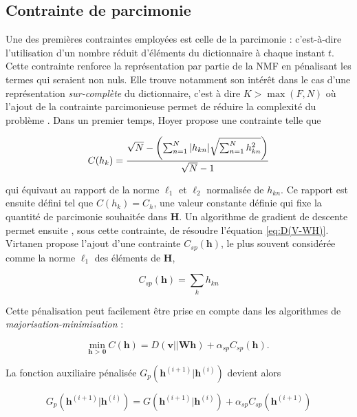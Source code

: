 \subsection{Contrainte de parcimonie}
Une des premières contraintes employées est celle de la parcimonie \cite{hoyer_non-negative_2004, le2015sparse} : c'est-à-dire l'utilisation d'un nombre réduit d'éléments du dictionnaire à chaque instant $t$. Cette contrainte renforce la représentation par partie de la NMF en pénalisant les termes qui seraient non nuls. Elle trouve notamment son intérêt dans le cas d'une représentation \textit{sur-complète} du dictionnaire, c'est à dire $K > \max(F,N)$ où l'ajout de la contrainte parcimonieuse permet de réduire la complexité du problème \cite{eggert2004sparse}. Dans un premier temps, Hoyer \cite{hoyer_non-negative_2004} propose une contrainte telle que

\begin{equation}
C(h_k) = \frac{\sqrt{N}-\left( \sum_{n=1}^N \vert h_{kn} \vert \/ \sqrt{\sum_{n = 1}^N h_{kn}^2} \right)}{\sqrt{N}-1}
\end{equation}

qui équivaut au rapport de la norme $\ell_1$ et $\ell_2$ normalisée de $h_{kn}$. Ce rapport est ensuite défini tel que $C(h_k) = C_h$, une valeur constante définie qui fixe la quantité de parcimonie souhaitée dans $\mathbf{H}$. Un algorithme de gradient de descente permet ensuite , sous cette contrainte, de résoudre l'équation \ref{eq:D(V-WH)}. Virtanen \cite{virtanen_monaural_2007} propose l'ajout d'une contrainte $C_{sp}(\mathbf{h})$, le plus souvent considérée comme la norme $\ell_1$ des éléments de $\mathbf{H}$,

\begin{equation}
C_{sp}(\mathbf{h}) = \sum_k h_{kn}
\end{equation}

Cette pénalisation peut facilement être prise en compte dans les algorithmes de \textit{majorisation-minimisation} :

\begin{equation}
\underset{\textbf{h > 0}}{\text{min}}~C(\mathbf{h}) = D(\mathbf{v} \vert\vert \mathbf{Wh}) + \alpha_{sp} C_{sp}(\mathbf{h}).
\end{equation}

La fonction auxiliaire pénalisée $G_p(\mathbf{h}^{(i+1)}\vert \mathbf{h}^{(i)})$ devient alors

\begin{equation}
G_p(\mathbf{h}^{(i+1)}\vert \mathbf{h}^{(i)}) = G(\mathbf{h}^{(i+1)}\vert \mathbf{h}^{(i)})+ \alpha_{sp}C_{sp}(\mathbf{h}^{(i+1)})
\end{equation}

